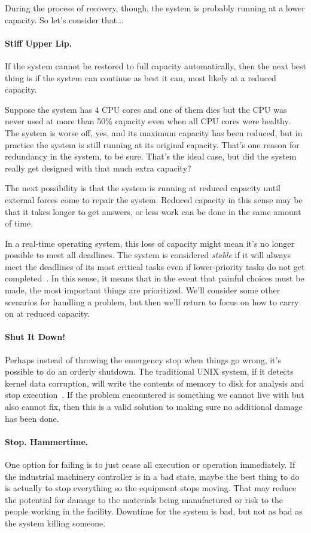 During the process of recovery, though, the system is probably running at a lower capacity. So let's consider that...

\paragraph{Stiff Upper Lip.} If the system cannot be restored to full capacity automatically, then the next best thing is if the system can continue as best it can, most likely at a reduced capacity. 

Suppose the system has 4 CPU cores and one of them dies but the CPU was never used at more than 50\% capacity even when all CPU cores were healthy. The system is worse off, yes, and its maximum capacity has been reduced, but in practice the system is still running at its original capacity. That's one reason for redundancy in the system, to be sure. That's the ideal case, but did the system really get designed with that much extra capacity?

The next possibility is that the system is running at reduced capacity until external forces come to repair the system. Reduced capacity in this sense may be that it takes longer to get answers, or less work can be done in the same amount of time. 

In a real-time operating system, this loss of capacity might mean it's no longer possible to meet all deadlines. The system is considered \textit{stable} if it will always meet the deadlines of its most critical tasks even if lower-priority tasks do not get completed~\cite{osi}. In this sense, it means that in the event that painful choices must be made, the most important things are prioritized. We'll consider some other scenarios for handling a problem, but then we'll return to focus on how to carry on at reduced capacity.

\paragraph{Shut It Down!} Perhaps instead of throwing the emergency stop when things go wrong, it's possible to do an orderly shutdown. The traditional UNIX system, if it detects kernel data corruption, will write the contents of memory to disk for analysis and stop execution~\cite{osi}. If the problem encountered is something we cannot live with but also cannot fix, then this is a valid solution to making sure no additional damage has been done.

\paragraph{Stop. Hammertime.} One option for failing is to just cease all execution or operation immediately. If the industrial machinery controller is in a bad state, maybe the best thing to do is actually to stop everything so the equipment stops moving. That may reduce the potential for damage to the materials being manufactured or risk to the people working in the facility. Downtime for the system is bad, but not as bad as the system killing someone.

